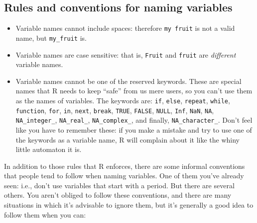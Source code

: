 \documentclass[
]{book}
\providecommand{\tightlist}{%
  \setlength{\itemsep}{0pt}\setlength{\parskip}{0pt}}
\begin{document}
\hypertarget{rules-and-conventions-for-naming-variables}{%
\subsection{Rules and conventions for naming variables}\label{rules-and-conventions-for-naming-variables}}

\begin{itemize}
\tightlist
\item
  Variable names cannot include spaces: therefore \texttt{my\ fruit} is not a valid name, but \texttt{my\_fruit} is.
\item
  Variable names are case sensitive: that is, \texttt{Fruit} and \texttt{fruit} are \emph{different} variable names.
\item
  Variable names cannot be one of the reserved keywords. These are special names that R needs to keep ``safe'' from us mere users, so you can't use them as the names of variables. The keywords are: \texttt{if}, \texttt{else}, \texttt{repeat}, \texttt{while}, \texttt{function}, \texttt{for}, \texttt{in}, \texttt{next}, \texttt{break}, \texttt{TRUE}, \texttt{FALSE}, \texttt{NULL}, \texttt{Inf}, \texttt{NaN}, \texttt{NA}, \texttt{NA\_integer\_}, \texttt{NA\_real\_}, \texttt{NA\_complex\_}, and finally, \texttt{NA\_character\_}. Don't feel like you have to remember these: if you make a mistake and try to use one of the keywords as a variable name, R will complain about it like the whiny little automaton it is.
\end{itemize}

In addition to those rules that R enforces, there are some informal conventions that people tend to follow when naming variables. One of them you've already seen: i.e., don't use variables that start with a period. But there are several others. You aren't obliged to follow these conventions, and there are many situations in which it's advisable to ignore them, but it's generally a good idea to follow them when you can:
\end{document}
